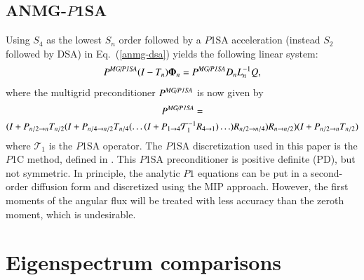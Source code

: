 \documentclass[preprint,10pt]{elsarticle}
\newcommand\bs{\boldsymbol}
\renewcommand{\(}{\left(}
\renewcommand{\)}{\right)}
\renewcommand{\[}{\left[}
\renewcommand{\]}{\right]}
\newcommand{\be}{\begin{equation}}
\newcommand{\ee}{\end{equation}}
\newcommand{\eqt}[1]{Eq.~(\ref{#1})}                     %
\begin{document}
\subsection{ANMG-$P$1SA}

Using $S_4$ as the lowest $S_n$ order followed by a $P$1SA acceleration (instead $S_2$ followed by DSA) in 
\eqt{anmg-dsa} yields the following linear system:
%
\be
\label{anmg-p1sa}
P^{\text{\it MG/$P$1SA}} (I-T_n) \bs{\Phi}_n =  P^{\text{\it MG/$P$1SA}} D_n L_n^{-1} Q ,
\ee
%
where the multigrid preconditioner $P^{\text{\it MG/$P$1SA}}$ is now given by
%
\begin{multline}
P^{\text{\it MG/$P$1SA}} =
\\
(I+P_{n/2\rightarrow n} T_{n/2} (I+P_{n/4\rightarrow n/2}
T_{n/4}(\hdots(I+P_{1\rightarrow 4}\mathcal{T}_1^{-1} R_{4\rightarrow
1})\hdots)R_{n/2 \rightarrow n/4})R_{n\rightarrow n/2}) 
 (I+P_{n/2\rightarrow n} T_{n/2})
\end{multline}
%
%
where $\mathcal{T}_1$ is the $P$1SA operator. 
The $P$1SA discretization used in this paper is the $P$1C method, defined in \cite{yaqiPhD,P1C_MC2009}. 
This $P$1SA preconditioner is positive definite (PD), but not symmetric.  In principle, 
the analytic $P1$ equations can be put in a second-order diffusion form and discretized 
using the MIP approach.  However, the first moments of the angular flux will be treated with 
less accuracy than the zeroth moment, which is undesirable.  

\section{Eigenspectrum comparisons} \label{sec:spectrum}
\end{document}
